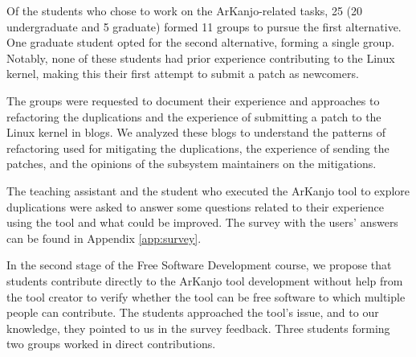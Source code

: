 Of the students who chose to work on the ArKanjo-related tasks, 25 (20 undergraduate and 5 graduate) 
formed 11 groups to pursue the first alternative. One graduate student opted for the second alternative, 
forming a single group. Notably, none of these students had prior experience contributing to the 
Linux kernel, making this their first attempt to submit a patch as newcomers.

The groups were requested to document their experience and approaches to refactoring the 
duplications and the experience of submitting a patch to the Linux kernel in blogs. We analyzed 
these blogs to understand the patterns of refactoring used for mitigating the duplications, the 
experience of sending the patches, and the opinions of the subsystem maintainers on the mitigations.

The teaching assistant and the student who executed the ArKanjo tool to explore duplications were 
asked to answer some questions related to their experience using the tool and what could be improved. 
The survey with the users' answers can be found in Appendix \ref{app:survey}.

In the second stage of the Free Software Development course, we propose that students contribute 
directly to the ArKanjo tool development without help from the tool creator to verify whether the 
tool can be free software to which multiple people can contribute. The students approached the tool’s 
issue, and to our knowledge, they pointed to us in the survey feedback. Three students forming two 
groups worked in direct contributions.
